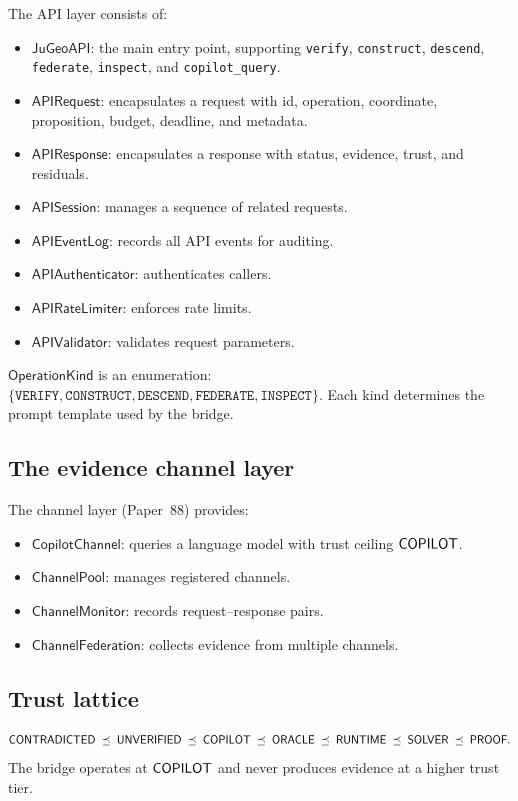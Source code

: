 \documentclass[11pt]{article}
\newcommand{\JuGeoAPI}{\mathsf{JuGeoAPI}}
\newcommand{\APIReq}{\mathsf{APIRequest}}
\newcommand{\APIResp}{\mathsf{APIResponse}}
\newcommand{\APISess}{\mathsf{APISession}}
\newcommand{\APILog}{\mathsf{APIEventLog}}
\newcommand{\APIAuth}{\mathsf{APIAuthenticator}}
\newcommand{\APIRate}{\mathsf{APIRateLimiter}}
\newcommand{\APIVal}{\mathsf{APIValidator}}
\newcommand{\OpKind}{\mathsf{OperationKind}}
\newcommand{\CopChan}{\mathsf{CopilotChannel}}
\newcommand{\ChanPool}{\mathsf{ChannelPool}}
\newcommand{\ChanMon}{\mathsf{ChannelMonitor}}
\newcommand{\ChanFed}{\mathsf{ChannelFederation}}
\begin{document}
The API layer consists of:
\begin{itemize}
\item $\JuGeoAPI$: the main entry point, supporting
      \texttt{verify}, \texttt{construct}, \texttt{descend},
      \texttt{federate}, \texttt{inspect}, and
      \texttt{copilot\_query}.
\item $\APIReq$: encapsulates a request with id, operation,
      coordinate, proposition, budget, deadline, and metadata.
\item $\APIResp$: encapsulates a response with status,
      evidence, trust, and residuals.
\item $\APISess$: manages a sequence of related requests.
\item $\APILog$: records all API events for auditing.
\item $\APIAuth$: authenticates callers.
\item $\APIRate$: enforces rate limits.
\item $\APIVal$: validates request parameters.
\end{itemize}

\begin{definition}\label{def:opkind}
$\OpKind$ is an enumeration:
$\{\texttt{VERIFY}, \texttt{CONSTRUCT}, \texttt{DESCEND},
\texttt{FEDERATE}, \texttt{INSPECT}\}$.
Each kind determines the prompt template used by the bridge.
\end{definition}

\subsection{The evidence channel layer}

The channel layer (Paper~88) provides:
\begin{itemize}
\item $\CopChan$: queries a language model with trust ceiling
      $\mathsf{COPILOT}$.
\item $\ChanPool$: manages registered channels.
\item $\ChanMon$: records request--response pairs.
\item $\ChanFed$: collects evidence from multiple channels.
\end{itemize}

\subsection{Trust lattice}

\[
  \mathsf{CONTRADICTED} \;\preceq\; \mathsf{UNVERIFIED} \;\preceq\; \mathsf{COPILOT}
  \;\preceq\; \mathsf{ORACLE} \;\preceq\; \mathsf{RUNTIME}
  \;\preceq\; \mathsf{SOLVER} \;\preceq\; \mathsf{PROOF}.
\]
The bridge operates at $\mathsf{COPILOT}$ and never produces
evidence at a higher trust tier.
\end{document}
